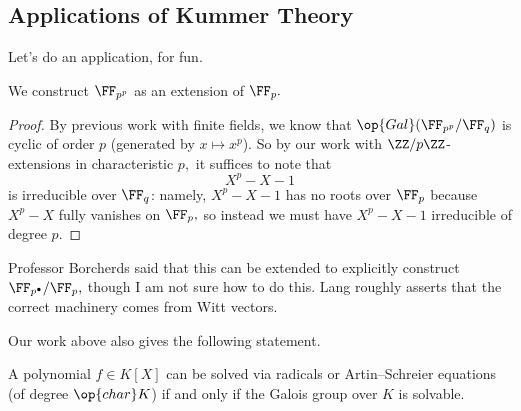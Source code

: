 \subsection{Applications of Kummer Theory}
Let's do an application, for fun.
\begin{exe}
	We construct $\FF_{p^p}$ as an extension of $\FF_p.$
\end{exe}
\begin{proof}
	By previous work with finite fields, we know that $\op{Gal}(\FF_{p^p}/\FF_q)$ is cyclic of order $p$ (generated by $x\mapsto x^p$). So by our work with $\ZZ/p\ZZ$-extensions in characteristic $p,$ it suffices to note that
	\[X^p-X-1\]
	is irreducible over $\FF_q$: namely, $X^p-X-1$ has no roots over $\FF_p$ because $X^p-X$ fully vanishes on $\FF_p,$ so instead we must have $X^p-X-1$ irreducible of degree $p.$
\end{proof}
\begin{remark}
	Professor Borcherds said that this can be extended to explicitly construct $\FF_{p^\bullet}/\FF_p,$ though I am not sure how to do this. Lang roughly asserts that the correct machinery comes from Witt vectors.
\end{remark}
Our work above also gives the following statement.
\begin{theorem}
	A polynomial $f\in K[X]$ can be solved via radicals or Artin--Schreier equations (of degree $\op{char}K$) if and only if the Galois group over $K$ is solvable.
\end{theorem}
